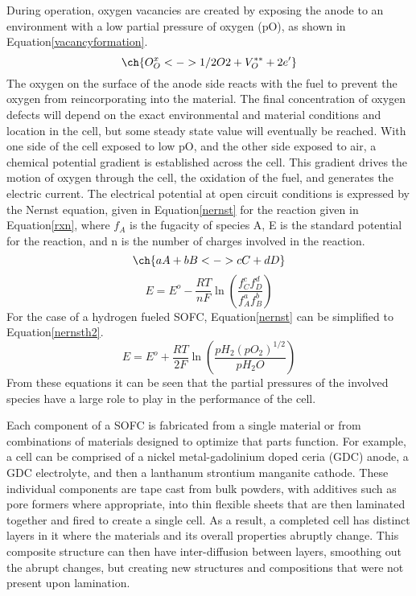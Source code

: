 During operation, oxygen vacancies are created by exposing the anode to an environment with a low partial pressure of oxygen (pO), as shown in Equation\ref{vacancyformation}.
\begin{equation} \label{vacancyformation}
\ch{O_O^x  <-> 1/2 O2 + V_O^{**} + 2 e'}
\end{equation}
The oxygen on the surface of the anode side reacts with the fuel to prevent the oxygen from reincorporating into the material.
The final concentration of oxygen defects will depend on the exact environmental and material conditions and location in the cell, but some steady state value will eventually be reached.
With one side of the cell exposed to low pO, and the other side exposed to air, a chemical potential gradient is established across the cell.
This gradient drives the motion of oxygen through the cell, the oxidation of the fuel, and generates the electric current.
The electrical potential at open circuit conditions is expressed by the Nernst equation, given in Equation\ref{nernst} for the reaction given in Equation\ref{rxn}, where \(f_A\) is the fugacity of species A, E is the standard potential for the reaction, and n is the number of charges involved in the reaction.\cite{Larminie2001}
\begin{equation}
  \label{rxn}
\ch{aA + bB  <-> cC + dD}
\end{equation}
\begin{equation}
  \label{nernst}
E = E^o - \frac{RT}{nF}\ln\left(\frac{f_C^c f_D^d}{f_A^a f_B^b}\right)
\end{equation}
For the case of a hydrogen fueled SOFC, Equation\ref{nernst} can be simplified to Equation\ref{nernsth2}.\cite{Pilatowsky2008}
\begin{equation}
  \label{nernsth2}
E = E^o + \frac{RT}{2F}\ln\left(\frac{pH_2 {(pO_2)}^{1/2}}{pH_2 O}\right)
\end{equation}
From these equations it can be seen that the partial pressures of the involved species have a large role to play in the performance of the cell.

Each component of a SOFC is fabricated from a single material or from combinations of materials designed to optimize that parts function.
For example, a cell can be comprised of a nickel metal-gadolinium doped ceria (GDC) anode, a GDC electrolyte, and then a  lanthanum strontium manganite cathode.\cite{Liu2002,Haile2003}
These individual components are tape cast from bulk powders, with additives such as pore formers where appropriate, into thin flexible sheets that are then laminated together and fired to create a single cell.
As a result, a completed cell has distinct layers in it where the materials and its overall properties abruptly change.
This composite structure can then have inter-diffusion between layers, smoothing out the abrupt changes, but creating new structures and compositions that were not present upon lamination.\cite{Yokokawa2008a}

